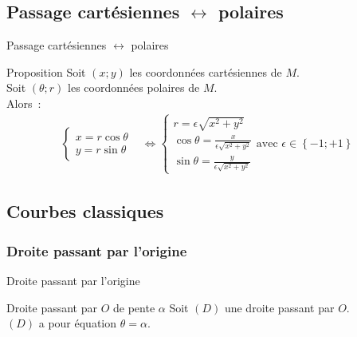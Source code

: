 \documentclass[14pt]{beamer}
\begin{document}
\subsection{Passage cartésiennes $\leftrightarrow$ polaires}
\begin{frame}{Passage cartésiennes $\leftrightarrow$ polaires}
        \begin{alertblock}{Proposition}
                Soit $(x;y)$ les coordonnées cartésiennes de $M$.\\
                Soit $(\theta;r)$ les coordonnées polaires de $M$.\\
                Alors~:
                \begin{align*}
                        \left\{\begin{array}{l}
x=r\cos \theta\\
y=r\sin \theta
                        \end{array}\right. & \Leftrightarrow
                        \left\{\begin{array}{l}
                                r=\epsilon\sqrt{x^2 + y^2}\\
                                \cos\theta=\frac{x}{\epsilon\sqrt{x^2 + y^2}}\\
                                \sin\theta=\frac{y}{\epsilon\sqrt{x^2 + y^2}}
                        \end{array}\right.
                        \text{avec }\epsilon\in\left\{-1;+1\right\}
                \end{align*}
        \end{alertblock}
\end{frame}
\subsection{Courbes classiques}
\subsubsection{Droite passant par l'origine}
\begin{frame}{Droite passant par l'origine}
        \begin{alertblock}{Droite passant par $O$ de pente $\alpha$}
                Soit $(D)$ une droite passant par $O$.\\
                $(D)$ a pour équation $\theta=\alpha$.\\
                \begin{center}
                \end{center}
        \end{alertblock}
\end{frame}
\end{document}
